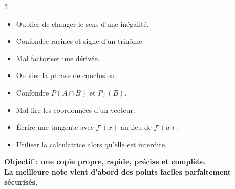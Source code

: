 \documentclass[11pt,a4paper]{article}
\begin{document}
\begin{alerte}
\begin{multicols}{2}
\begin{itemize}
  \item Oublier de changer le sens d'une inégalité.
  \item Confondre racines et signe d'un trinôme.
  \item Mal factoriser une dérivée.
  \item Oublier la phrase de conclusion.
  \item Confondre $P(A\cap B)$ et $P_A(B)$.
  \item Mal lire les coordonnées d'un vecteur.
  \item Écrire une tangente avec $f'(x)$ au lieu de $f'(a)$.
  \item Utiliser la calculatrice alors qu'elle est interdite.
\end{itemize}
\end{multicols}
\end{alerte}

\vfill

\begin{center}
\Large
\textbf{Objectif : une copie propre, rapide, précise et complète.}\\[1mm]
\textbf{La meilleure note vient d'abord des points faciles parfaitement sécurisés.}
\end{center}
\end{document}
